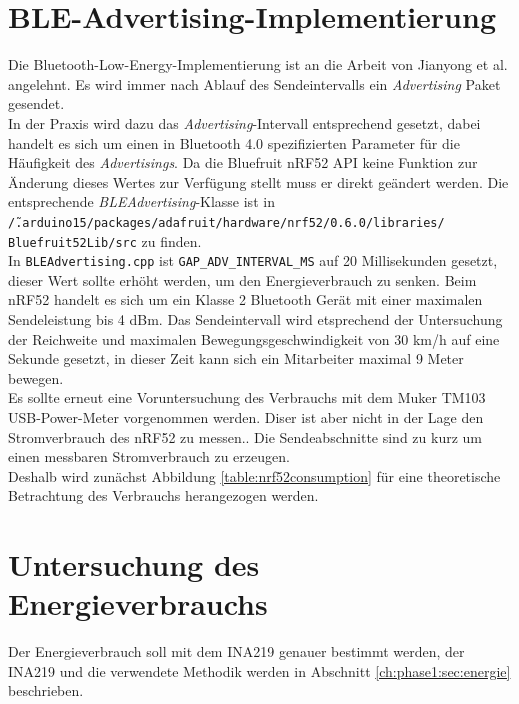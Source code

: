 \section{BLE-Advertising-Implementierung}
\label{ch:phase3:sec:advertising}
Die Bluetooth-Low-Energy-Implementierung ist an die Arbeit von Jianyong et al. angelehnt.
Es wird immer nach Ablauf des Sendeintervalls ein \emph{Advertising} Paket gesendet.\\
In der Praxis wird dazu das \emph{Advertising}-Intervall entsprechend gesetzt, dabei handelt es sich um einen in Bluetooth 4.0 spezifizierten Parameter für die Häufigkeit des \emph{Advertisings}.
Da die Bluefruit nRF52 API keine Funktion zur Änderung dieses Wertes zur Verfügung stellt muss er direkt geändert werden.
Die entsprechende \emph{BLEAdvertising}-Klasse ist in \\\texttt{\~/.arduino15/packages/adafruit/hardware/nrf52/0.6.0/libraries/}\\\texttt{Bluefruit52Lib/src} zu finden. \\
In \texttt{BLEAdvertising.cpp} ist \texttt{GAP\_ADV\_INTERVAL\_MS} auf 20 Millisekunden gesetzt, dieser Wert sollte erhöht werden, um den Energieverbrauch zu senken.
Beim nRF52 handelt es sich um ein Klasse 2 Bluetooth Gerät mit einer maximalen Sendeleistung bis 4 dBm.
Das Sendeintervall wird etsprechend der Untersuchung der Reichweite und maximalen Bewegungsgeschwindigkeit von 30 km/h auf eine Sekunde gesetzt, in dieser Zeit kann sich ein Mitarbeiter maximal 9 Meter bewegen.\\
Es sollte erneut eine Voruntersuchung des Verbrauchs mit dem Muker TM103 USB-Power-Meter vorgenommen werden.
Diser ist aber nicht in der Lage den Stromverbrauch des nRF52 zu messen..
Die Sendeabschnitte sind zu kurz um einen messbaren Stromverbrauch zu erzeugen.\\
Deshalb wird zunächst Abbildung \ref{table:nrf52consumption} für eine theoretische Betrachtung des Verbrauchs herangezogen werden. 




\section{Untersuchung des Energieverbrauchs}
Der Energieverbrauch soll mit dem INA219 genauer bestimmt werden, der INA219 und die verwendete Methodik werden in Abschnitt \ref{ch:phase1:sec:energie} beschrieben.

